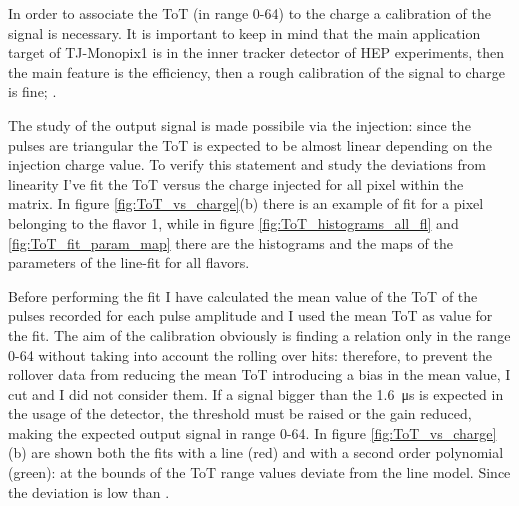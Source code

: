         In order to associate the ToT (in range 0-64) to the charge a calibration of the signal is necessary. It is important to keep in mind that the main application target of TJ-Monopix1 is in the inner tracker detector of HEP experiments, then the main feature is the efficiency, then a rough calibration of the signal to charge is fine; . 
        
        The study of the output signal is made possibile via the injection: since the pulses are triangular the ToT is expected to be almost linear depending on the injection charge value.
        To verify this statement and study the deviations from linearity I've fit the ToT versus the charge injected for all pixel within the matrix.
        In figure \ref{fig:ToT_vs_charge}(b) there is an example of fit for a pixel belonging to the flavor 1, while in figure \ref{fig:ToT_histograms_all_fl} and \ref{fig:ToT_fit_param_map} there are the histograms and the maps of the parameters of the line-fit for all flavors.  

        Before performing the fit I have calculated the mean value of the ToT of the pulses recorded for each pulse amplitude and I used the mean ToT as value for the fit. 
        The aim of the calibration obviously is finding a relation only in the range 0-64 without taking into account the rolling over hits: therefore, to prevent the rollover data from reducing the mean ToT introducing a bias in the mean value, I cut and I did not consider them. 
        If a signal bigger than the \SI{1.6}{\us} is expected in the usage of the detector, the threshold must be raised or the gain reduced, making the expected output signal in range 0-64. 
        In figure \ref{fig:ToT_vs_charge} (b) are shown both the fits with a line (red) and with a second order polynomial (green): at the bounds of the ToT range values deviate from the line model. Since the deviation is low than . 

